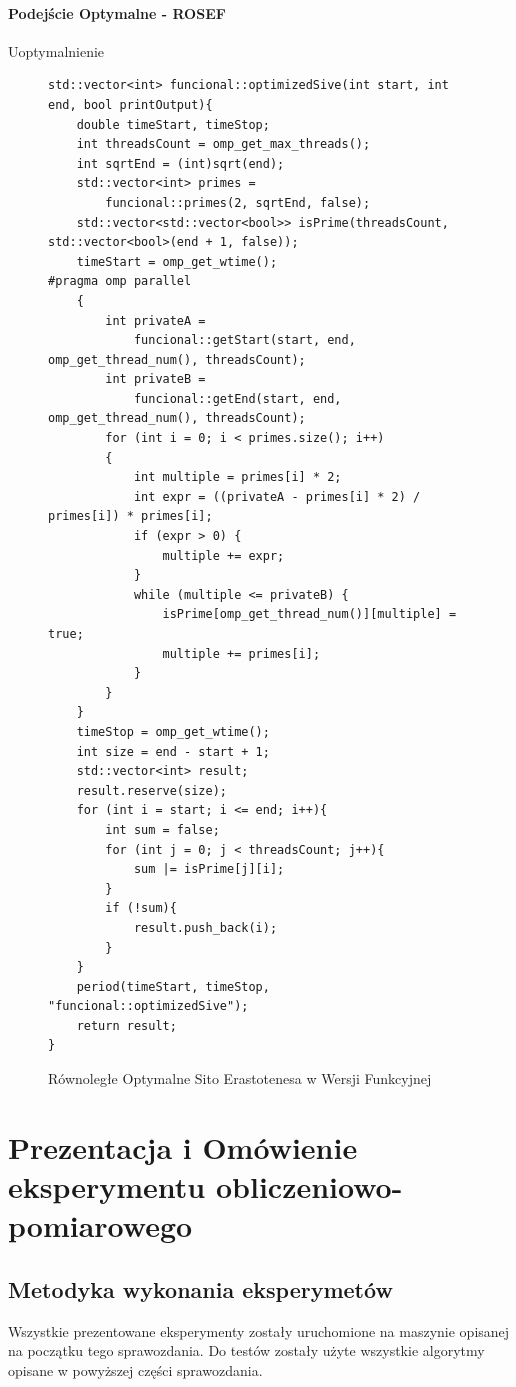 \documentclass{article}
\begin{document}
                    \paragraph{Podejście Optymalne - \gls{ROSEF}}
                        Uoptymalnienie 
                        \begin{figure}[H]
                            \begin{verbatim}
std::vector<int> funcional::optimizedSive(int start, int end, bool printOutput){
    double timeStart, timeStop;
    int threadsCount = omp_get_max_threads();
    int sqrtEnd = (int)sqrt(end);
    std::vector<int> primes = 
        funcional::primes(2, sqrtEnd, false);
    std::vector<std::vector<bool>> isPrime(threadsCount, std::vector<bool>(end + 1, false));
    timeStart = omp_get_wtime();
#pragma omp parallel
    {
        int privateA = 
            funcional::getStart(start, end, omp_get_thread_num(), threadsCount);
        int privateB = 
            funcional::getEnd(start, end, omp_get_thread_num(), threadsCount);
        for (int i = 0; i < primes.size(); i++)
        {
            int multiple = primes[i] * 2;
            int expr = ((privateA - primes[i] * 2) / primes[i]) * primes[i];
            if (expr > 0) {
                multiple += expr;
            }
            while (multiple <= privateB) {
                isPrime[omp_get_thread_num()][multiple] = true;
                multiple += primes[i];
            }
        }
    }
    timeStop = omp_get_wtime();
    int size = end - start + 1;
    std::vector<int> result;
    result.reserve(size);
    for (int i = start; i <= end; i++){
        int sum = false;
        for (int j = 0; j < threadsCount; j++){
            sum |= isPrime[j][i];
        }
        if (!sum){
            result.push_back(i);
        }
    }
    period(timeStart, timeStop, "funcional::optimizedSive");
    return result;
}
                            \end{verbatim}
                            \caption{Równoległe Optymalne Sito Erastotenesa w Wersji Funkcyjnej}
                        \end{figure}
    \section{Prezentacja i Omówienie eksperymentu obliczeniowo-pomiarowego}
        \subsection{Metodyka wykonania eksperymetów}
                Wszystkie prezentowane eksperymenty zostały uruchomione na maszynie opisanej na początku tego sprawozdania. Do testów zostały użyte wszystkie algorytmy opisane w powyższej części sprawozdania.
                
\end{document}
